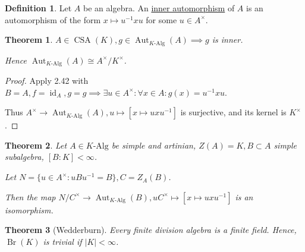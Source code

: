 \documentclass{article}
\theoremstyle{definition}
\newtheorem*{definition}{Definition}
\theoremstyle{plain}
\newtheorem{theorem}{Theorem}[section]
\theoremstyle{remark}
\begin{document}
    \begin{definition}
        Let \(A\) be an algebra. An \underline{inner automorphism} of \(A\) is an automorphism of the form \(x \mapsto u ^{-1} x u\) for some \(u \in A^\times\).
    \end{definition}

    \begin{theorem}
        \(A \in \operatorname{CSA}(K), g \in \operatorname{Aut}_{K\text{-Alg}}(A) \implies g \) is inner.

        Hence \(\operatorname{Aut}_{K \text{-Alg}}(A) \cong A^\times / K^\times\). 
    \end{theorem}

    \begin{proof}
        Apply 2.42 with \(B=A , f = \operatorname{id}_{A}, g = g \implies \exists u\in A^\times : \forall x\in A: g(x) = u ^{-1} x u\).

        Thus \(A^\times \to \operatorname{Aut}_{K\text{-Alg}}(A), u \mapsto [x \mapsto u x u ^{-1}]\) is surjective, and its kernel is \(K^\times\). 

    \end{proof}

    \begin{theorem}
        Let \(A\in K\text{-Alg}\) be simple and artinian, \(Z(A) = K, B \subset A\) simple subalgebra, \([B:K] < \infty\).
        
        Let \(N = \{ u \in A^\times : u B u ^{-1} = B \}, C = Z_A(B)\).

        Then the map \(N / C^\times \to \operatorname{Aut}_{K\text{-Alg}}(B), u C^\times \mapsto [x \mapsto u x u ^{-1}]\) is an isomorphism.
    \end{theorem}

    \begin{theorem}
        [Wedderburn] Every finite division algebra is a finite field. Hence, \(\operatorname{Br}(K)\) is trivial if \(\vert K \vert < \infty\). 
    \end{theorem}
\end{document}
